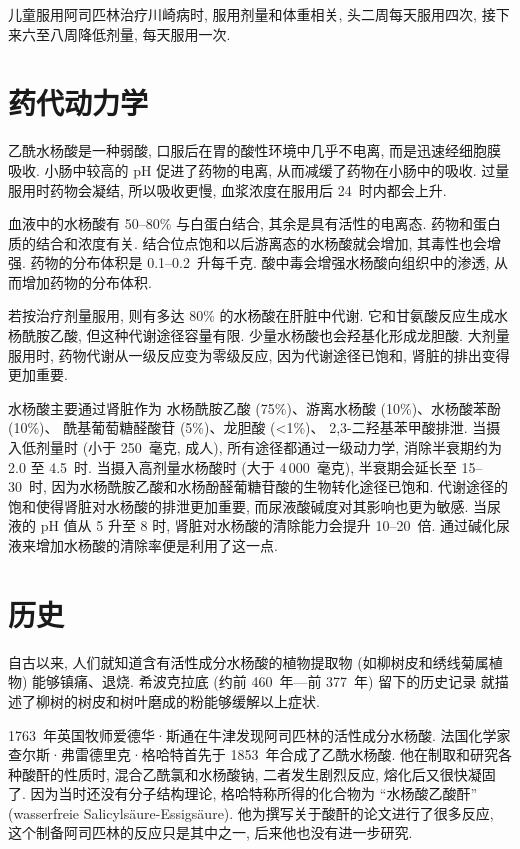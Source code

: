 儿童服用阿司匹林治疗川崎病时, 服用剂量和体重相关,
头二周每天服用四次, 接下来六至八周降低剂量, 每天服用一次.

\section{药代动力学}

乙酰水杨酸是一种弱酸,
口服后在胃的酸性环境中几乎不电离,
而是迅速经细胞膜吸收.
小肠中较高的 pH 促进了药物的电离,
从而减缓了药物在小肠中的吸收.
过量服用时药物会凝结, 所以吸收更慢,
血浆浓度在服用后 24~时内都会上升.

血液中的水杨酸有 50--80\% 与白蛋白结合,
其余是具有活性的电离态.
药物和蛋白质的结合和浓度有关.
结合位点饱和以后游离态的水杨酸就会增加, 其毒性也会增强.
药物的分布体积是 0.1--0.2~升每千克.
酸中毒会增强水杨酸向组织中的渗透, 从而增加药物的分布体积.

若按治疗剂量服用, 则有多达 80\% 的水杨酸在肝脏中代谢.
它和甘氨酸反应生成水杨酰胺乙酸, 但这种代谢途径容量有限.
少量水杨酸也会羟基化形成龙胆酸.
大剂量服用时, 药物代谢从一级反应变为零级反应,
因为代谢途径已饱和, 肾脏的排出变得更加重要.

水杨酸主要通过肾脏作为%
水杨酰胺乙酸 (75\%)、游离水杨酸 (10\%)、水杨酸苯酚 (10\%)、%
酰基葡萄糖醛酸苷 (5\%)、龙胆酸 (<1\%)、 2,3-二羟基苯甲酸排泄.
当摄入低剂量时 (小于 250~毫克, 成人),
所有途径都通过一级动力学, 消除半衰期约为 2.0 至 4.5~时.
当摄入高剂量水杨酸时 (大于 4\,000~毫克),
半衰期会延长至 15--30~时,
因为水杨酰胺乙酸和水杨酚醛葡糖苷酸的生物转化途径已饱和.
代谢途径的饱和使得肾脏对水杨酸的排泄更加重要,
而尿液酸碱度对其影响也更为敏感.
当尿液的 pH 值从 5 升至 8 时,
肾脏对水杨酸的清除能力会提升 10--20~倍.
通过碱化尿液来增加水杨酸的清除率便是利用了这一点.

\section{历史}

自古以来, 人们就知道含有活性成分水杨酸的植物提取物
(如柳树皮和绣线菊属植物) 能够镇痛、退烧.
希波克拉底 (约前 460~年—前 377~年) 留下的历史记录%
就描述了柳树的树皮和树叶磨成的粉能够缓解以上症状.

1763~年英国牧师爱德华·斯通在牛津发现阿司匹林的活性成分水杨酸.
法国化学家查尔斯·弗雷德里克·格哈特首先于 1853~年合成了乙酰水杨酸.
他在制取和研究各种酸酐的性质时, 混合乙酰氯和水杨酸钠,
二者发生剧烈反应, 熔化后又很快凝固了.
因为当时还没有分子结构理论, 格哈特称所得的化合物为
``水杨酸乙酸酐''
(wasserfreie Salicyls\"aure-Essigs\"aure).
他为撰写关于酸酐的论文进行了很多反应,
这个制备阿司匹林的反应只是其中之一, 后来他也没有进一步研究.

